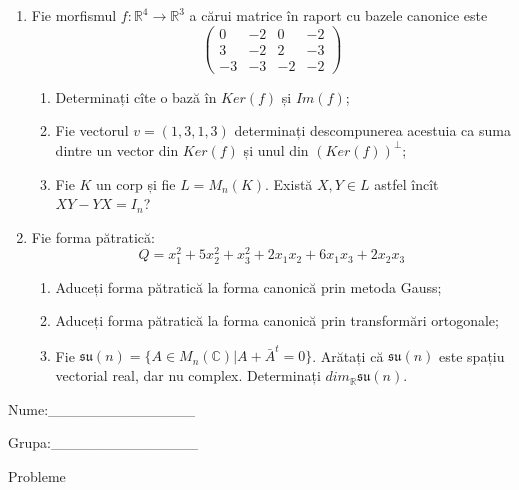 \documentclass{article}
\begin{document}
\begin{enumerate}
 \item Fie morfismul $f:\mathbb{R}^4 \to \mathbb{R}^3$ a cărui matrice în raport cu bazele canonice este
$$\begin{pmatrix}
0&-2&0&-2\\
3&-2&2&-3\\
-3&-3&-2&-2
\end{pmatrix}$$

\begin{enumerate}
\item Determinați cîte o bază în $Ker(f)$ și $Im(f)$;
\item Fie vectorul $v=(1,3,1,3)$ determinați descompunerea acestuia ca suma dintre un vector din $Ker(f)$ și unul din $(Ker(f))^\perp$;
\item Fie $K$ un corp și fie $L=M_n(K)$. Există $X,Y \in L$ astfel încît $XY-YX=I_n$?  
\end{enumerate}
\item Fie forma pătratică:
$$Q= x_1^2+5x_2^2+x_3^2+2x_1x_2+6x_1x_3+2x_2x_3$$

\begin{enumerate}
\item Aduceți forma pătratică la forma canonică prin metoda Gauss;
\item Aduceți forma pătratică la forma canonică prin transformări ortogonale;
\item Fie $\mathfrak{su}(n)=\{ A \in M_n(\mathbb{C}) | A+\bar{A}^t=0\}$. Arătați că $\mathfrak{su}(n)$ este spațiu vectorial real, dar nu complex.
Determinați $dim_{\mathbb{R}}\mathfrak{su}(n)$.
\end{enumerate}
\end{enumerate}
\newpage
\begin{flushright}
Nume:\_\_\_\_\_\_\_\_\_\_\_\_\_\_
 
 
Grupa:\_\_\_\_\_\_\_\_\_\_\_\_\_\_
\end{flushright}
\begin{center}
\vspace{2cm}
{\Large Probleme}
\vspace{2cm}
\end{center}
\end{document}
